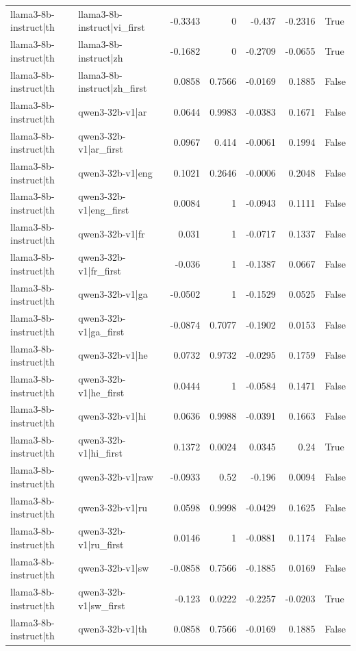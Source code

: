 \begin{table}
\begin{tabular}{l l r r r r l}
llama3-8b-instruct|th & llama3-8b-instruct|vi_first & -0.3343 & 0 & -0.437 & -0.2316 & True \\
llama3-8b-instruct|th & llama3-8b-instruct|zh & -0.1682 & 0 & -0.2709 & -0.0655 & True \\
llama3-8b-instruct|th & llama3-8b-instruct|zh_first & 0.0858 & 0.7566 & -0.0169 & 0.1885 & False \\
llama3-8b-instruct|th & qwen3-32b-v1|ar & 0.0644 & 0.9983 & -0.0383 & 0.1671 & False \\
llama3-8b-instruct|th & qwen3-32b-v1|ar_first & 0.0967 & 0.414 & -0.0061 & 0.1994 & False \\
llama3-8b-instruct|th & qwen3-32b-v1|eng & 0.1021 & 0.2646 & -0.0006 & 0.2048 & False \\
llama3-8b-instruct|th & qwen3-32b-v1|eng_first & 0.0084 & 1 & -0.0943 & 0.1111 & False \\
llama3-8b-instruct|th & qwen3-32b-v1|fr & 0.031 & 1 & -0.0717 & 0.1337 & False \\
llama3-8b-instruct|th & qwen3-32b-v1|fr_first & -0.036 & 1 & -0.1387 & 0.0667 & False \\
llama3-8b-instruct|th & qwen3-32b-v1|ga & -0.0502 & 1 & -0.1529 & 0.0525 & False \\
llama3-8b-instruct|th & qwen3-32b-v1|ga_first & -0.0874 & 0.7077 & -0.1902 & 0.0153 & False \\
llama3-8b-instruct|th & qwen3-32b-v1|he & 0.0732 & 0.9732 & -0.0295 & 0.1759 & False \\
llama3-8b-instruct|th & qwen3-32b-v1|he_first & 0.0444 & 1 & -0.0584 & 0.1471 & False \\
llama3-8b-instruct|th & qwen3-32b-v1|hi & 0.0636 & 0.9988 & -0.0391 & 0.1663 & False \\
llama3-8b-instruct|th & qwen3-32b-v1|hi_first & 0.1372 & 0.0024 & 0.0345 & 0.24 & True \\
llama3-8b-instruct|th & qwen3-32b-v1|raw & -0.0933 & 0.52 & -0.196 & 0.0094 & False \\
llama3-8b-instruct|th & qwen3-32b-v1|ru & 0.0598 & 0.9998 & -0.0429 & 0.1625 & False \\
llama3-8b-instruct|th & qwen3-32b-v1|ru_first & 0.0146 & 1 & -0.0881 & 0.1174 & False \\
llama3-8b-instruct|th & qwen3-32b-v1|sw & -0.0858 & 0.7566 & -0.1885 & 0.0169 & False \\
llama3-8b-instruct|th & qwen3-32b-v1|sw_first & -0.123 & 0.0222 & -0.2257 & -0.0203 & True \\
llama3-8b-instruct|th & qwen3-32b-v1|th & 0.0858 & 0.7566 & -0.0169 & 0.1885 & False \\

\end{tabular}
\end{table}
